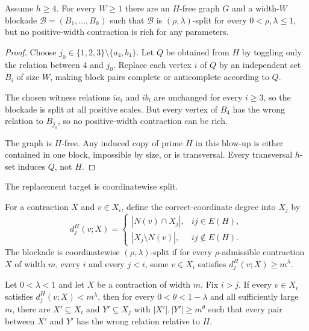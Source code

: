 \begin{proposition}\label{prop:two-anchor-not-rich}
Assume $h\ge 4$. For every $W\ge 1$ there are an $H$-free graph $G$ and a width-$W$ blockade $\mathcal B=(B_1,\dots,B_h)$ such that $\mathcal B$ is $(\rho,\lambda)$-split for every $0<\rho,\lambda\le 1$, but no positive-width contraction is rich for any parameters.
\end{proposition}

\begin{proof}
Choose $j_0\in\{1,2,3\}\setminus\{a_4,b_4\}$. Let $Q$ be obtained from $H$ by toggling only the relation between $4$ and $j_0$. Replace each vertex $i$ of $Q$ by an independent set $B_i$ of size $W$, making block pairs complete or anticomplete according to $Q$.

The chosen witness relations $i a_i$ and $i b_i$ are unchanged for every $i\ge 3$, so the blockade is split at all positive scales. But every vertex of $B_4$ has the wrong relation to $B_{j_0}$, so no positive-width contraction can be rich.

The graph is $H$-free. Any induced copy of prime $H$ in this blow-up is either contained in one block, impossible by size, or is transversal. Every transversal $h$-set induces $Q$, not $H$.
\end{proof}

The replacement target is coordinatewise split.

\begin{definition}
For a contraction $X$ and $v\in X_i$, define the correct-coordinate degree into $X_j$ by
\[
 d^H_j(v;X)=
 \begin{cases}
 |N(v)\cap X_j|, & ij\in E(H),\\
 |X_j\setminus N(v)|, & ij\notin E(H).
 \end{cases}
\]
The blockade is coordinatewise $(\rho,\lambda)$-split if for every $\rho$-admissible contraction $X$ of width $m$, every $i$ and every $j<i$, some $v\in X_i$ satisfies $d^H_j(v;X)\ge m^\lambda$.
\end{definition}

\begin{lemma}\label{lem:failed-coordinate}
Let $0<\lambda<1$ and let $X$ be a contraction of width $m$. Fix $i>j$. If every $v\in X_i$ satisfies $d^H_j(v;X)<m^\lambda$, then for every $0<\theta<1-\lambda$ and all sufficiently large $m$, there are $X'\subseteq X_i$ and $Y'\subseteq X_j$ with $|X'|,|Y'|\ge m^\theta$ such that every pair between $X'$ and $Y'$ has the wrong relation relative to $H$.
\end{lemma}

